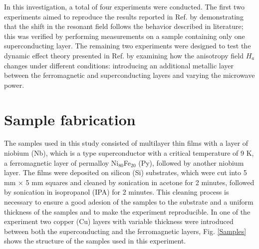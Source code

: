 \documentclass[12pt,a4paper,oneside,openany]{book}
\newcommand{\RomanNumeralCaps}[1] %
{\MakeUppercase{\romannumeral #1}}
\begin{document}
In this investigation, a total of four experiments were conducted. The first two experiments aimed to reproduce the results reported in Ref. \cite{Magnetization} by demonstrating that the shift in the resonant field follows the behavior described in literature; this was verified by performing measurements on a sample containing only one superconducting layer. The remaining two experiments were designed to test the dynamic effect theory presented in Ref. \cite{Russian} by examining how the anisotropy field $H_a$ changes under different conditions: introducing an additional metallic layer between the ferromagnetic and superconducting layers and varying the microwave power.

\section{Sample fabrication}\label{Sputter}
The samples used in this study consisted of multilayer thin films with a layer of niobium (Nb), which is a type \RomanNumeralCaps{2} superconductor with a critical temperature of 9 K, a ferromagnetic layer of permalloy Ni$_{80}$Fe$_{20}$ (Py), followed by another niobium layer. The films were deposited on silicon (Si) substrates, which were cut into 5 mm $\times$ 5 mm squares and cleaned by sonication in acetone for 2 minutes, followed by sonication in isopropanol (IPA) for 2 minutes. This cleaning process is necessary to ensure a good adesion of the samples to the substrate and a uniform thickness of the samples and to make the experiment reproducible. In one of the experiment two copper (Cu) layers with variable thickness were introduced between both the superconducting and the ferromagnetic layers, Fig. \ref{Samples} shows the structure of the samples used in this experiment.
\end{document}
